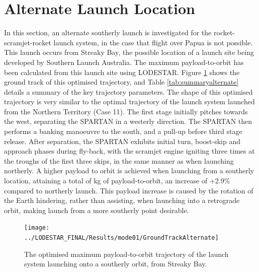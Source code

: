 \section{Alternate Launch Location}

In this section, an alternate southerly launch is investigated for the rocket-scramjet-rocket launch system, in the case that flight over Papua is not possible. This launch occurs from Streaky Bay, the possible location of a launch site being developed by Southern Launch Australia\cite{Council2016}. The maximum payload-to-orbit has been calculated from this launch site using LODESTAR. Figure \ref{fig:GroundTrackAlternate} shows the ground track of this optimised trajectory, and Table \ref{tab:summaryalternate} details a summary of the key trajectory parameters. The shape of this optimised trajectory is very similar to the optimal trajectory of the launch system launched from the Northern Territory (Case 11). The first stage initially pitches towards the west, separating the SPARTAN in a westerly direction. The SPARTAN then performs a banking manoeuvre to the south, and a pull-up before third stage release. After separation, the SPARTAN exhibits initial turn, boost-skip and approach phases during fly-back, with the scramjet engine igniting three times at the troughs of the first three skips, in the same manner as when launching northerly. A higher payload to orbit is achieved when launching from a southerly location, attaining a total of \PayloadToOrbitAlternate kg of payload-to-orbit, an increase of +2.9\% compared to northerly launch. This payload increase is caused by the rotation of the Earth hindering, rather than assisting, when launching into a retrograde orbit, making launch from a more southerly point desirable. 


\begin{figure}[th]
	\centering
	\texttt{[image: ../LODESTAR\_FINAL/Results/mode01/GroundTrackAlternate]}
	\caption{The optimised maximum payload-to-orbit trajectory of the launch system launching onto a southerly orbit, from Streaky Bay.}
	\label{fig:GroundTrackAlternate}
\end{figure}

